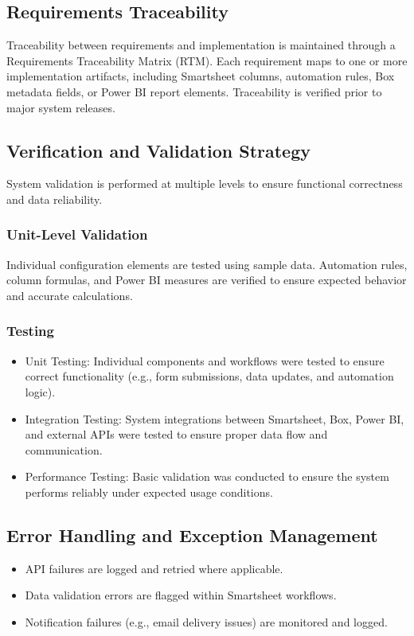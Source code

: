 \documentclass[12pt]{article}
\def\textbf#1{#1}%
\begin{document}
\subsection{Requirements Traceability}

Traceability between requirements and implementation is maintained through a Requirements Traceability Matrix (RTM). Each requirement maps to one or more implementation artifacts, including Smartsheet columns, automation rules, Box metadata fields, or Power BI report elements. Traceability is verified prior to major system releases.

\subsection{Verification and Validation Strategy}

System validation is performed at multiple levels to ensure functional correctness and data reliability.

\subsubsection{Unit-Level Validation}

Individual configuration elements are tested using sample data. Automation rules, column formulas, and Power BI measures are verified to ensure expected behavior and accurate calculations.

\subsubsection{Testing}
\begin{itemize}
    \item \textbf{Unit Testing:} Individual components and workflows were tested to ensure correct functionality (e.g., form submissions, data updates, and automation logic).
    \item \textbf{Integration Testing:} System integrations between Smartsheet, Box, Power BI, and external APIs were tested to ensure proper data flow and communication.
    \item \textbf{Performance Testing:} Basic validation was conducted to ensure the system performs reliably under expected usage conditions.
\end{itemize}

\subsection{Error Handling and Exception Management}
\begin{itemize}
    \item API failures are logged and retried where applicable.
    \item Data validation errors are flagged within Smartsheet workflows.
    \item Notification failures (e.g., email delivery issues) are monitored and logged.
\end{itemize}
\end{document}
